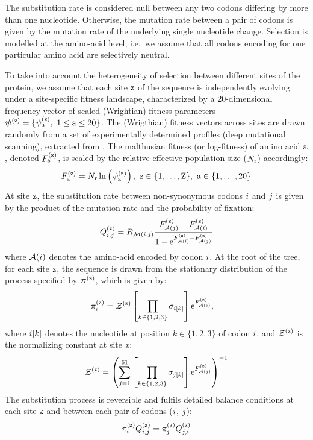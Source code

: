 \documentclass{article}
\begin{document}
The {substitution} rate is considered null between any two codons differing by more than one nucleotide.
Otherwise, the mutation rate between a pair of codons is given by the mutation rate of the underlying single nucleotide change.
Selection is modelled at the amino-acid level, i.e.~we assume that all codons encoding for one particular amino acid are selectively {neutral}.

To take into account the heterogeneity of selection between different sites of the protein, we assume that each site $\text{z}$ of the sequence is independently evolving under a site-specific fitness landscape, characterized by a 20-dimensional frequency vector of scaled (Wrightian) fitness parameters $\bm{\psi}^{(\text{z})} = \{ \psi^{(\text{z})}_{\text{a}},\ 1 \leq \text{a} \leq 20 \}$.
The (Wrigthian) fitness vectors across sites are drawn randomly from a set of experimentally determined profiles (deep mutational scanning), extracted from \citet{Bloom2017}.
The malthusian fitness (or log-fitness) of amino acid $\text{a}$, denoted $F^{(\text{z})}_{\text{a}}$, is scaled by the relative effective population size ($N_{\text{r}}$) accordingly:
\begin{equation}
 F^{(\text{z})}_{\text{a}} = N_{\text{r}} \ln \left( \psi^{(\text{z})}_{\text{a}} \right),\ \text{z} \in \{1, \hdots, \text{Z}\}, \ \text{a} \in \{1, \hdots, 20\}
\end{equation}
At site $\text{z}$, the {substitution} rate between {non-synonymous} codons ${i}$ and ${j}$ is given by the product of the mutation rate and the probability of fixation:
\begin{equation}
 Q_{{i}, {j}}^{(\text{z})} = R_{\mathcal{M}({i}, {j})} \dfrac{F_{\mathcal{A}({j})}^{(\text{z})} - F_{\mathcal{A}({i})}^{(\text{z})}}{1 - \text{e}^{F_{\mathcal{A}({i})}^{(\text{z})} - F_{\mathcal{A}({j})}^{(\text{z})}} } \label{eq:codonsubrates}
\end{equation}
where $\mathcal{A}({i})$ denotes the amino-acid encoded by codon ${i}$.
At the root of the tree, for each site $\text{z}$, the sequence is drawn from the stationary distribution of the process specified by $\bm{\pi}^{(\text{z})}$, which is given by:
\begin{align}
 \pi_{{i}}^{(\text{z})} & = \mathcal{Z}^{(\text{z})} \left[\prod\limits_{k \in \{ 1, 2, 3 \}} \sigma_{{i}[k]}\right] \text{e}^{F_{\mathcal{A}({i})}^{(\text{z})}},
 \label{codonStationarity}
\end{align}
where ${i}[k]$ denotes the nucleotide at position $k \in \{ 1, 2, 3 \}$ of codon ${i}$, and $\mathcal{Z}^{(\text{z})} $ is the normalizing constant at site $\text{z}$:
\begin{align}
 \mathcal{Z}^{(\text{z})} = \left( \sum\limits_{{j}=1}^{61} \left[\prod\limits_{k \in \{ 1, 2, 3 \}} \sigma_{{j}[k]}\right] \text{e}^{F_{\mathcal{A}({j})}^{(\text{z})}} \right)^{-1}
\end{align}
The {substitution} process is reversible and fulfils detailed balance conditions at each site $\text{z}$ and between each pair of codons (${i}$, ${j}$):
\begin{align}
 \pi_{{i}}^{(\text{z})} Q_{{i}, {j}}^{(\text{z})} = \pi_{{j}}^{(\text{z})} Q_{{j}, {i}}^{(\text{z})}
 \label{codonSubBalance}
\end{align}
\end{document}
